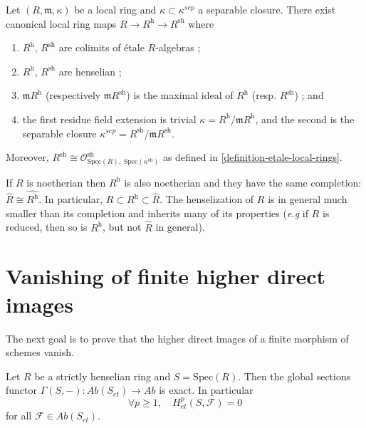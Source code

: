 \begin{theorem}
\label{theorem-henselization}
Let $(R, \mathfrak m, \kappa)$ be a local ring and
$\kappa\subset\kappa^{sep}$ a separable closure. There exist canonical local
ring maps $ R\to R^\text{h} \to R^\text{sh}$ where
\begin{enumerate}
\item $R^\text{h}$, $R^\text{sh}$ are colimits of \'etale $R$-algebras ;
\item $R^\text{h}$, $R^\text{sh}$ are henselian ;
\item $\mathfrak m R^\text{h}$ (respectively $\mathfrak m R^\text{sh}$) is the
maximal ideal of $R^\text{h}$ (resp. $R^\text{sh}$) ; and
\item the first residue field extension is trivial $\kappa=R^\text{h}/\mathfrak
m R^\text{h}$, and the second is the separable closure $\kappa^{sep} =
R^\text{sh}/\mathfrak m R^\text{sh}$.
\end{enumerate}
Moreover,
$R^\text{sh} \cong \mathcal{O}^\text{sh}_{\text{Spec}(R), \;
\text{Spec}(\kappa^\text{sh})}$
as defined in \ref{definition-etale-local-rings}.
\end{theorem}

\begin{remark}
\label{remark-henselization-Noetherian}
If $R$ is noetherian then $R^\text{h}$ is also noetherian and they have the
same completion: $\hat R\cong \widehat{R^\text{h}}$. In particular, $R\subset
R^\text{h} \subset \hat R$. The henselization of $R$ is in general much
smaller than its completion and inherits many of its properties ({\it e.g} if
$R$ is reduced, then so is $R^\text{h}$, but not $\hat R$ in general).
\end{remark}




\section{Vanishing of finite higher direct images}
\label{section-vanishing-finite-morphism}

\noindent
The next goal is to prove that the higher direct images of a finite morphism of
schemes vanish.

\begin{lemma}
\label{lemma-vanishing-etale-cohomology-strictly-henselian}
Let $R$ be a strictly henselian ring and $S=\text{Spec}(R)$. Then the global
sections functor $\Gamma(S, -): \textit{Ab}(S_{et})\to \textit{Ab}$ is exact. In
particular
$$
\forall p\geq 1, \quad H_{et}^p(S, \mathcal{F})=0
$$
for all $\mathcal{F}\in \textit{Ab}(S_{et})$.
\end{lemma}

